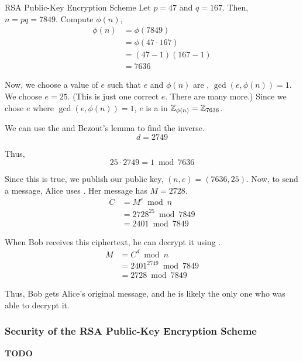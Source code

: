 \begin{example}{RSA Public-Key Encryption Scheme}
  Let $p = 47$ and $q = 167$.
  Then, $n = pq = 7849$.
  Compute $\phi(n)$,
  \begin{equation*}
    \begin{aligned}
      \phi(n) &= \phi(7849) \\
      &= \phi(47 \cdot 167) \\
      &= (47 - 1) (167 - 1) \\
      &= 7636
    \end{aligned}
  \end{equation*}

  Now, we choose a value of $e$ such that $e$ and $\phi(n)$ are , $\gcd(e, \phi(n)) = 1$.
  We choose $e=25$. (This is just one correct $e$. There are many more.)
  Since we chose $e$ where $\gcd(e, \phi(n)) = 1$, $e$ is a  in $\operatorname{\mathbb{Z}}_{\phi(n)} = \operatorname{\mathbb{Z}}_{7636}$.

  We can use the  and Bezout's lemma to find the inverse.
  \begin{equation*}
    d = 2749
  \end{equation*}

  Thus,
  \begin{equation*}
    25 \cdot 2749 = 1 \bmod 7636
  \end{equation*}

  Since this is true, we publish our public key, $(n, e) = (7636, 25)$.
  \tcblower{}
  Now, to send a message, Alice uses .
  Her message has $M = 2728$.
  \begin{equation*}
    \begin{aligned}
      C &= M^{e} \bmod n \\
      &= 2728^{25} \bmod 7849 \\
      &= 2401 \bmod 7849
    \end{aligned}
  \end{equation*}

  When Bob receives this ciphertext, he can decrypt it using .
  \begin{equation*}
    \begin{aligned}
      M &= C^{d} \bmod n \\
      &= 2401^{2749} \bmod 7849 \\
      &= 2728 \bmod 7849
    \end{aligned}
  \end{equation*}

  Thus, Bob gets Alice's original message, and he is likely the only one who was able to decrypt it.
\end{example}

\subsubsection{Security of the RSA Public-Key Encryption Scheme}\label{subsubsec:RSA_Encryption_Scheme-Security}
\textbf{TODO}

